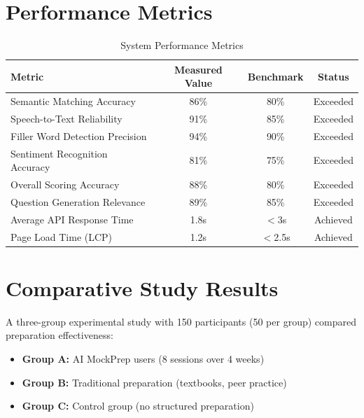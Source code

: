 \documentclass[12pt,a4paper,oneside]{report}
\begin{document}
\section{Performance Metrics}

\begin{table}[H]
\centering
\caption{System Performance Metrics}
\label{tab:performance_metrics}
\begin{tabular}{|l|c|c|c|}
\hline
\textbf{Metric} & \textbf{Measured Value} & \textbf{Benchmark} & \textbf{Status} \\
\hline
Semantic Matching Accuracy & 86\% & 80\% & Exceeded \\
\hline
Speech-to-Text Reliability & 91\% & 85\% & Exceeded \\
\hline
Filler Word Detection Precision & 94\% & 90\% & Exceeded \\
\hline
Sentiment Recognition Accuracy & 81\% & 75\% & Exceeded \\
\hline
Overall Scoring Accuracy & 88\% & 80\% & Exceeded \\
\hline
Question Generation Relevance & 89\% & 85\% & Exceeded \\
\hline
Average API Response Time & 1.8s & $<$3s & Achieved \\
\hline
Page Load Time (LCP) & 1.2s & $<$2.5s & Achieved \\
\hline
\end{tabular}
\end{table}


\section{Comparative Study Results}

A three-group experimental study with 150 participants (50 per group) compared preparation effectiveness:

\begin{itemize}
  \item \textbf{Group A:} AI MockPrep users (8 sessions over 4 weeks)
  \item \textbf{Group B:} Traditional preparation (textbooks, peer practice)
  \item \textbf{Group C:} Control group (no structured preparation)
\end{itemize}
\end{document}
